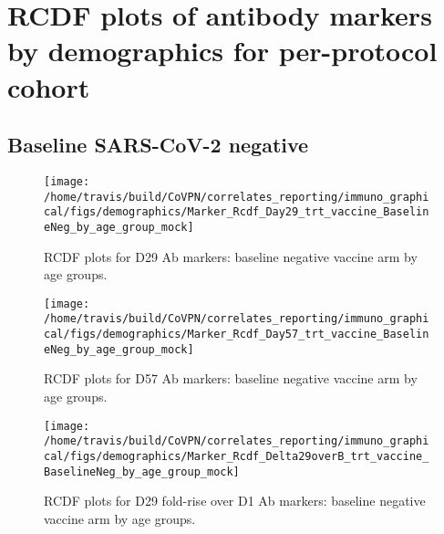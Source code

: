 \documentclass[]{book}
\theoremstyle{definition}
\theoremstyle{definition}
\theoremstyle{definition}
\newcommand{\1}{\mathbbm{1}}
\begin{document}
\clearpage

\hypertarget{rcdf-plots-of-antibody-markers-by-demographics-for-per-protocol-cohort}{%
\section{RCDF plots of antibody markers by demographics for per-protocol cohort}\label{rcdf-plots-of-antibody-markers-by-demographics-for-per-protocol-cohort}}

\hypertarget{baseline-sars-cov-2-negative-4}{%
\subsection{Baseline SARS-CoV-2 negative}\label{baseline-sars-cov-2-negative-4}}

\begin{figure}[H]

{\centering \texttt{[image: /home/travis/build/CoVPN/correlates\_reporting/immuno\_graphical/figs/demographics/Marker\_Rcdf\_Day29\_trt\_vaccine\_BaselineNeg\_by\_age\_group\_mock]} 

}

\caption{RCDF plots for D29 Ab markers: baseline negative vaccine arm by age groups.}\label{fig:unnamed-chunk-55}
\end{figure}

\clearpage
\begin{figure}[H]

{\centering \texttt{[image: /home/travis/build/CoVPN/correlates\_reporting/immuno\_graphical/figs/demographics/Marker\_Rcdf\_Day57\_trt\_vaccine\_BaselineNeg\_by\_age\_group\_mock]} 

}

\caption{RCDF plots for D57 Ab markers: baseline negative vaccine arm by age groups.}\label{fig:unnamed-chunk-56}
\end{figure}

\clearpage
\begin{figure}[H]

{\centering \texttt{[image: /home/travis/build/CoVPN/correlates\_reporting/immuno\_graphical/figs/demographics/Marker\_Rcdf\_Delta29overB\_trt\_vaccine\_BaselineNeg\_by\_age\_group\_mock]} 

}

\caption{RCDF plots for D29 fold-rise over D1 Ab markers: baseline negative vaccine arm by age groups.}\label{fig:unnamed-chunk-57}
\end{figure}
\end{document}
